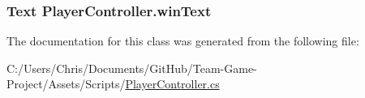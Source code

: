 \subsubsection[{\texorpdfstring{win\+Text}{winText}}]{\setlength{\rightskip}{0pt plus 5cm}Text Player\+Controller.\+win\+Text}\hypertarget{class_player_controller_a366f431ae274e7b19365f7b15b1709b8}{}\label{class_player_controller_a366f431ae274e7b19365f7b15b1709b8}


The documentation for this class was generated from the following file\+:\begin{DoxyCompactItemize}
\item 
C\+:/\+Users/\+Chris/\+Documents/\+Git\+Hub/\+Team-\/\+Game-\/\+Project/\+Assets/\+Scripts/\hyperlink{_player_controller_8cs}{Player\+Controller.\+cs}\end{DoxyCompactItemize}

